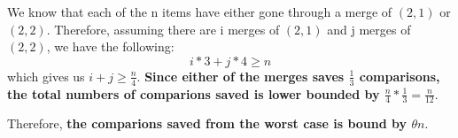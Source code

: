 \documentclass[12pt]{article}
\begin{document}
\begin{enumerate}
\begin{itemize}
We know that each of the n items have either gone through a merge of $(2,1)$ or $(2,2)$. Therefore, assuming there are i merges of $(2,1)$ and j merges of $(2,2)$, we have the following:
\begin{equation}
i * 3 + j * 4 \geq n
\end{equation}
which gives us $i + j \geq \frac{n}{4}$. \textbf{Since either of the merges saves $\frac{1}{3}$ comparisons, the total numbers of comparions saved is lower bounded by $\frac{n}{4} * \frac{1}{3} = \frac{n}{12}$}.

Therefore,  \textbf{the comparions saved from the worst case is bound by $\theta{n}$}.

\end{itemize}


\end{enumerate}
\end{document}
